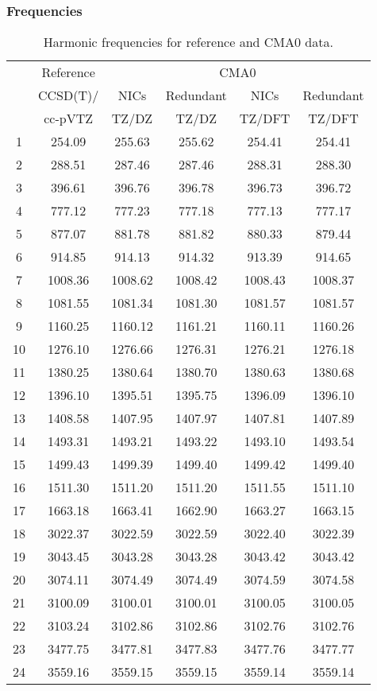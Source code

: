 \documentclass[10pt,oneside]{article}
\begin{document}
\begin{table}[h!]
\subsubsection*{Frequencies}
\centering
\caption{Harmonic frequencies for reference and CMA0 data.}
\begin{tabular}{cccccc}
\toprule
{} & Reference & \multicolumn{4}{c}{CMA0} \\
{} &  CCSD(T)/ &    NICs &  Redundant &    NICs & Redundant \\
{} &   cc-pVTZ &   TZ/DZ &      TZ/DZ &  TZ/DFT &    TZ/DFT \\
\midrule
1  &    254.09 &  255.63 &     255.62 &  254.41 &    254.41 \\
2  &    288.51 &  287.46 &     287.46 &  288.31 &    288.30 \\
3  &    396.61 &  396.76 &     396.78 &  396.73 &    396.72 \\
4  &    777.12 &  777.23 &     777.18 &  777.13 &    777.17 \\
5  &    877.07 &  881.78 &     881.82 &  880.33 &    879.44 \\
6  &    914.85 &  914.13 &     914.32 &  913.39 &    914.65 \\
7  &   1008.36 & 1008.62 &    1008.42 & 1008.43 &   1008.37 \\
8  &   1081.55 & 1081.34 &    1081.30 & 1081.57 &   1081.57 \\
9  &   1160.25 & 1160.12 &    1161.21 & 1160.11 &   1160.26 \\
10 &   1276.10 & 1276.66 &    1276.31 & 1276.21 &   1276.18 \\
11 &   1380.25 & 1380.64 &    1380.70 & 1380.63 &   1380.68 \\
12 &   1396.10 & 1395.51 &    1395.75 & 1396.09 &   1396.10 \\
13 &   1408.58 & 1407.95 &    1407.97 & 1407.81 &   1407.89 \\
14 &   1493.31 & 1493.21 &    1493.22 & 1493.10 &   1493.54 \\
15 &   1499.43 & 1499.39 &    1499.40 & 1499.42 &   1499.40 \\
16 &   1511.30 & 1511.20 &    1511.20 & 1511.55 &   1511.10 \\
17 &   1663.18 & 1663.41 &    1662.90 & 1663.27 &   1663.15 \\
18 &   3022.37 & 3022.59 &    3022.59 & 3022.40 &   3022.39 \\
19 &   3043.45 & 3043.28 &    3043.28 & 3043.42 &   3043.42 \\
20 &   3074.11 & 3074.49 &    3074.49 & 3074.59 &   3074.58 \\
21 &   3100.09 & 3100.01 &    3100.01 & 3100.05 &   3100.05 \\
22 &   3103.24 & 3102.86 &    3102.86 & 3102.76 &   3102.76 \\
23 &   3477.75 & 3477.81 &    3477.83 & 3477.76 &   3477.77 \\
24 &   3559.16 & 3559.15 &    3559.15 & 3559.14 &   3559.14 \\
\bottomrule
\end{tabular}
\end{table}
\end{document}

